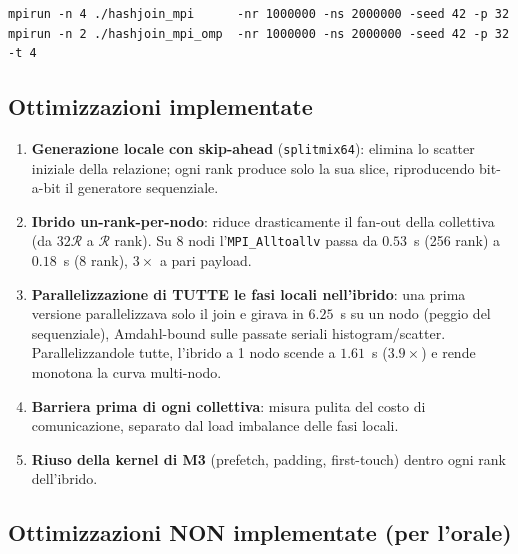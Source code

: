 \documentclass[11pt,a4paper]{article}
\theoremstyle{remark}
\begin{document}
\begin{lstlisting}[style=bash, caption={Run del Modulo 4 (locale).}]
mpirun -n 4 ./hashjoin_mpi      -nr 1000000 -ns 2000000 -seed 42 -p 32
mpirun -n 2 ./hashjoin_mpi_omp  -nr 1000000 -ns 2000000 -seed 42 -p 32 -t 4
\end{lstlisting}

\subsection{Ottimizzazioni implementate}

\begin{enumerate}
  \item \textbf{Generazione locale con skip-ahead} (\texttt{splitmix64}): elimina lo scatter iniziale della relazione; ogni rank produce solo la sua slice, riproducendo bit-a-bit il generatore sequenziale.
  \item \textbf{Ibrido un-rank-per-nodo}: riduce drasticamente il fan-out della collettiva (da $32\mathcal{R}$ a $\mathcal{R}$ rank). Su 8 nodi l'\texttt{MPI\_Alltoallv} passa da $0.53$~s (256 rank) a $0.18$~s (8 rank), $3\times$ a pari payload.
  \item \textbf{Parallelizzazione di TUTTE le fasi locali nell'ibrido}: una prima versione parallelizzava solo il join e girava in $6.25$~s su un nodo (peggio del sequenziale), Amdahl-bound sulle passate seriali histogram/scatter. Parallelizzandole tutte, l'ibrido a 1 nodo scende a $1.61$~s ($3.9\times$) e rende monotona la curva multi-nodo.
  \item \textbf{Barriera prima di ogni collettiva}: misura pulita del costo di comunicazione, separato dal load imbalance delle fasi locali.
  \item \textbf{Riuso della kernel di M3} (prefetch, padding, first-touch) dentro ogni rank dell'ibrido.
\end{enumerate}

\subsection{Ottimizzazioni NON implementate (per l'orale)}
\end{document}
